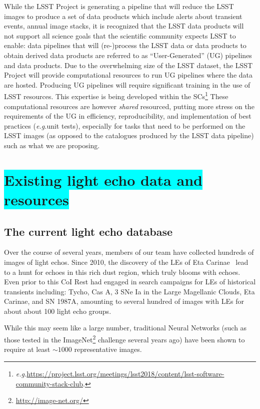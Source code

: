 \documentclass{proposalnsf}
\newcommand{\armin}[1]{\colorbox{cyan}{#1}}
\newcommand{\eg}{\emph{e.g.}}
\begin{document}
While the LSST Project is generating a pipeline that will reduce the LSST images to produce a set of data products which include alerts about transient events, annual image stacks, it is recognized that the LSST data products will not support all science goals that the scientific community expects LSST to enable:  data pipelines that will (re-)process the LSST data or data products to obtain derived data products are referred to as “User-Generated” (UG) pipelines and data products. Due to the overwhelming size of the LSST dataset, the LSST Project will provide computational resources to run UG pipelines where the data are hosted. Producing UG pipelines will require significant training in the use of  LSST resources. This expertise is being developed within the SCs\footnote{\eg \url{https://project.lsst.org/meetings/lsst2018/content/lsst-software-community-stack-club}.} These computational resources are however \emph{shared} resourced, putting more stress on the requirements of the UG in efficiency, reproducibility, and implementation of best practices (\eg unit tests), especially for tasks that need to be performed on the LSST images (as opposed to the catalogues produced by the LSST data pipeline) such as what we are proposing.




\section{\armin{Existing light echo data and resources}}\label{realdata}
\subsection{The current light echo database}
Over the course of several years, members of our team have collected hundreds of images of light echos.  Since 2010, the discovery of the LEs of Eta Carinae~\citep{Rest2019} lead to a hunt for echoes in this rich dust region, which truly blooms with echoes.  Even prior to this CoI Rest had engaged in search campaigns for LEs of historical transients including: Tycho, Cas A, 3 SNe Ia in the Large Magellanic Clouds, Eta Carinae, and SN 1987A, amounting to several hundred of images with LEs for about about 100 light echo groups.   

While this may seem like a large number, traditional Neural Networks (such as those tested in the ImageNet\footnote{\url{http://image-net.org/}} challenge several years ago) have been shown to require at least $\sim 1000$ representative images.
\end{document}
